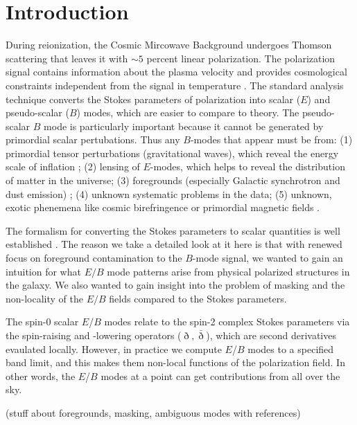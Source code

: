 \section{Introduction}
During reionization, the Cosmic Mircowave Background undergoes Thomson scattering that leaves it with $\sim 5$ percent linear polarization.  The polarization signal contains information about the plasma velocity and provides cosmological constraints independent from the signal in temperature \citep{1997NewA....2..323H}.  The standard analysis technique converts the Stokes parameters of polarization into scalar ($E$) and pseudo-scalar ($B$) modes, which are easier to compare to theory.  The pseudo-scalar $B$ mode is particularly important because it cannot be generated by primordial scalar pertubations.  Thus any $B$-modes that appear must be from:
(1) primordial tensor perturbations (gravitational waves), which reveal the energy scale of inflation
\citep{1997PhRvD..56..596H,1997PhRvL..78.2054S};
(2) lensing of $E$-modes, which helps to reveal the distribution of matter in the universe;
(3) foregrounds (especially Galactic synchrotron and dust emission)
\citep{2016A&A...586A.133P};
(4) unknown systematic problems in the data;
(5) unknown, exotic phenemena like cosmic birefringence or primordial magnetic fields
\citep{1996ApJ...469....1K,1999PhRvL..83.1506L,2004ApJ...616....1C,2014MNRAS.438.2508P}.
 
 
The formalism for converting the Stokes parameters to scalar quantities is well established \citep{1997PhRvD..55.7368K,1997PhRvD..55.1830Z}.  The reason we take a detailed look at it here is that with renewed focus on foreground contamination to the $B$-mode signal, we wanted to gain an intuition for what $E/B$ mode patterns arise from physical polarized structures in the galaxy.  We also wanted to gain insight into the problem of masking and the non-locality of the $E/B$ fields compared to the Stokes parameters.

The spin-0 scalar $E$/$B$ modes relate to the spin-2 complex Stokes parameters via the spin-raising and -lowering operators ($\eth,\bar \eth$), which are second derivatives evaulated locally.  However, in practice we compute $E$/$B$ modes to a specified band limit, and this makes them non-local functions of the polarization field.  In other words, the $E$/$B$ modes at a point can get contributions from all over the sky.

(stuff about foregrounds, masking, ambiguous modes with references)
 
